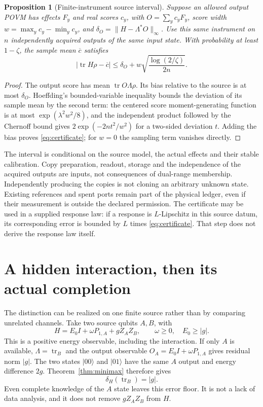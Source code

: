 \documentclass[12pt,a4paper]{article}
\newtheorem{proposition}[theorem]{Proposition}
\theoremstyle{definition}
\newcommand{\tr}{\operatorname{tr}}
\begin{document}
\begin{proposition}[Finite-instrument source interval]
\label{prop:finite}
Suppose an allowed output POVM has effects $F_y$ and real scores $c_y$,
with $O=\sum_y c_yF_y$, score width
$w=\max_y c_y-\min_y c_y$, and
$\delta_O=\|H-\Lambda^*O\|_\infty$. Use this same instrument on $n$
independently acquired outputs of the same input state. With probability
at least $1-\zeta$, the sample mean $\overline c$ satisfies
\begin{equation}
 |\tr H\rho-\overline c|
 \leq\delta_O+w\sqrt{\frac{\log(2/\zeta)}{2n}}.
 \label{eq:certificate}
\end{equation}
\end{proposition}
\begin{proof}
The output score has mean $\tr O\Lambda\rho$. Its bias relative to the
source is at most $\delta_O$. Hoeffding's bounded-variable inequality
\cite{Hoeffding1963} bounds the deviation of its sample mean by the
second term: the centered score moment-generating function is at most
$\exp(\lambda^2w^2/8)$, and the independent product followed by the
Chernoff bound gives $2\exp(-2nt^2/w^2)$ for a two-sided deviation $t$.
Adding the bias proves \eqref{eq:certificate}; for $w=0$ the sampling
term vanishes directly.
\end{proof}

The interval is conditional on the source model, the actual effects and
their stable calibration. Copy preparation, readout, storage and the
independence of the acquired outputs are inputs, not consequences of
dual-range membership. Independently producing the copies is not cloning
an arbitrary unknown state. Existing references and spent ports remain
part of the physical ledger, even if their measurement is outside the
declared permission. The certificate may be used in a supplied response
law: if a response is $L$-Lipschitz in this source datum, its corresponding
error is bounded by $L$ times \eqref{eq:certificate}. That step does not
derive the response law itself.

\section{A hidden interaction, then its actual completion}
\label{sec:completion}

The distinction can be realized on one finite source rather than by
comparing unrelated channels. Take two source qubits $A,B$, with
\begin{equation}
 H=E_0I+\omega P_{1,A}+g Z_AZ_B,
 \qquad \omega\geq0,\quad E_0\geq|g|.
 \label{eq:ABsource}
\end{equation}
This is a positive energy observable, including the interaction. If only
$A$ is available, $\Lambda=\tr_B$ and the output observable
$O_A=E_0I+\omega P_{1,A}$ gives residual norm $|g|$. The two states
$|00\rangle$ and $|01\rangle$ have the same $A$ output and energy
difference $2g$. Theorem~\ref{thm:minimax} therefore gives
\begin{equation}
 \delta_H(\tr_B)=|g|.
 \label{eq:ABdelta}
\end{equation}
Even complete knowledge of the $A$ state leaves this error floor. It is
not a lack of data analysis, and it does not remove $gZ_AZ_B$ from $H$.
\end{document}
